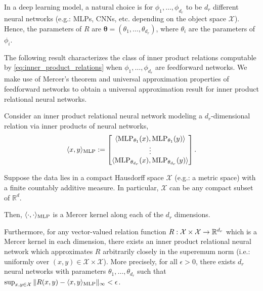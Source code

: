 In a deep learning model, a natural choice is for \(\phi_{1}, \ldots, \phi_{d_r}\) to be \(d_r\) different neural networks (e.g.: MLPs, CNNs, etc. depending on the object space \(\mathcal{X}\)). Hence, the parameters of \(R\) are \(\boldsymbol{\theta} = (\theta_{1}, \ldots, \theta_{d_r})\), where \(\theta_{i}\) are the parameters of \(\phi_{i}\).

The following result characterizes the class of inner product relations computable by \eqref{eq:inner_product_relations} when \(\phi_{1}, \ldots, \phi_{d_r}\) are feedforward networks. We make use of Mercer's theorem and universal approximation properties of feedforward networks to obtain a universal approximation result for inner product relational neural networks.


\begin{thm}
	\label{theorem:function_class_inner_product_relnn}
	\hphantom{~}

	Consider an inner product relational neural network modeling a \(d_r\)-dimensional relation via inner products of neural networks,
	\begin{equation*}
		\langle x, y \rangle_{\text{MLP}} := \begin{bmatrix}\langle \text{MLP}_{\theta_1}(x), \text{MLP}_{\theta_1}(y) \rangle \\ \vdots \\ \langle \text{MLP}_{\theta_{d_r}}(x), \text{MLP}_{\theta_{d_r}}(y) \rangle\end{bmatrix}.
	\end{equation*}

	Suppose the data lies in a compact Hausdorff space \(\mathcal{X}\) (e.g.: a metric space) with a finite countably additive measure. In particular, \(\mathcal{X}\) can be any compact subset of \(\mathbb{R}^d\).

	Then, \(\langle \cdot, \cdot \rangle_{\text{MLP}}\) is a Mercer kernel along each of the \(d_r\) dimensions.

	Furthermore, for any vector-valued relation function \(R: \mathcal{X} \times \mathcal{X} \to \mathbb{R}^{d_r}\) which is a Mercer kernel in each dimension, there exists an inner product relational neural network which approximates \(R\) arbitrarily closely in the superemum norm (i.e.: uniformly over \((x,y) \in \mathcal{X}\times\mathcal{X}\)). More precisely, for all \(\epsilon > 0\), there exists \(d_r\) neural networks with parameters \(\theta_1, \ldots, \theta_{d_r}\) such that \(\sup_{x,y \in \mathcal{X}}{\lVert R(x,y) - \langle x, y \rangle_{\text{MLP}} \rVert_\infty} < \epsilon\).
\end{thm}

